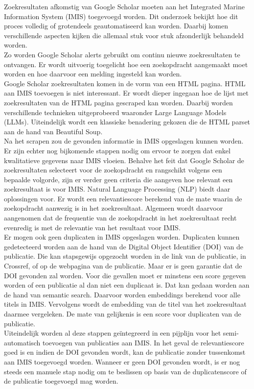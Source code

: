 Zoekresultaten afkomstig van Google Scholar moeten aan het Integrated Marine Information System (IMIS) toegevoegd worden. Dit onderzoek bekijkt hoe dit proces volledig of grotendeels geautomatiseerd kan worden. Daarbij komen verschillende aspecten kijken die allemaal stuk voor stuk afzonderlijk behandeld worden.\\
Zo worden Google Scholar alerts gebruikt om continu nieuwe zoekresultaten te ontvangen. Er wordt uitvoerig toegelicht hoe een zoekopdracht aangemaakt moet worden en hoe daarvoor een melding ingesteld kan worden.\\
Google Scholar zoekresultaten komen in de vorm van een HTML pagina. HTML aan IMIS toevoegen is niet interessant. Er wordt dieper ingegaan hoe de lijst met zoekresultaten van de HTML pagina gescraped kan worden. Daarbij worden verschillende technieken uitgeprobeerd waaronder Large Language Models (LLMs). Uiteindelijk wordt een klassieke benadering gekozen die de HTML parset aan de hand van Beautiful Soup.\\
Na het scrapen zou de gevonden informatie in IMIS opgeslagen kunnen worden. Er zijn echter nog bijkomende stappen nodig om ervoor te zorgen dat enkel kwalitatieve gegevens naar IMIS vloeien.
Behalve het feit dat Google Scholar de zoekresultaten selecteert voor de zoekopdracht en rangschikt volgens een bepaalde volgorde, zijn er verder geen criteria die aangeven hoe relevant een zoekresultaat is voor IMIS. Natural Language Processing (NLP) biedt daar oplossingen voor. Er wordt een relevantiescore berekend van de mate waarin de zoekopdracht aanwezig is in het zoekresultaat. Algemeen wordt daarvoor aangenomen dat de frequentie van de zoekopdracht in het zoekresultaat recht evenredig is met de relevantie van het resultaat voor IMIS.\\
Er mogen ook geen duplicaten in IMIS opgeslagen worden. Duplicaten kunnen gedetecteerd worden aan de hand van de Digital Object Identifier (DOI) van de publicatie. Die kan stapsgewijs opgezocht worden in de link van de publicatie, in Crossref, of op de webpagina van de publicatie. Maar er is geen garantie dat de DOI gevonden zal worden. Voor die gevallen moet er minstens een score gegeven worden of een publicatie al dan niet een duplicaat is. Dat kan gedaan worden aan de hand van semantic search. Daarvoor worden embeddings berekend voor alle titels in IMIS. Vervolgens wordt de embedding van de titel van het zoekresultaat daarmee vergeleken. De mate van gelijkenis is een score voor duplicaten van de publicatie.\\
Uiteindelijk worden al deze stappen geïntegreerd in een pijplijn voor het semi-automatisch toevoegen van publicaties aan IMIS. In het geval de relevantiescore goed is en indien de DOI gevonden wordt, kan de publicatie zonder tussenkomst aan IMIS toegevoegd worden. Wanneer er geen DOI gevonden wordt, is er nog steeds een manuele stap nodig om te beslissen op basis van de duplicatenscore of de publicatie toegevoegd mag worden.
